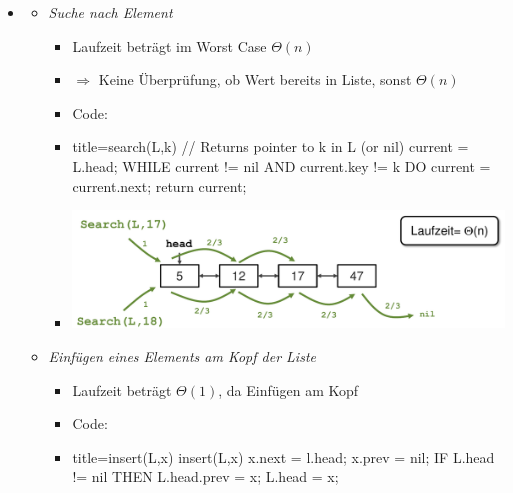 \documentclass[
    12pt,
    a4paper,
    ngerman,
    color=3b,%
    marginpar=false,
    colorback=false,
    leqno,
]{tudaexercise}
\begin{document}
\begin{itemize}
    \item {}
          \begin{itemize}
              \item \textit{Suche nach Element}
                    \begin{itemize}
                        \item Laufzeit beträgt im Worst Case $\Theta(n)$
                        \item[] $\Rightarrow$ Keine Überprüfung, ob Wert bereits in Liste, sonst $\Theta(n)$
                        \item Code:
                        \item[]
                              \begin{ccode}[autogobble]{title={search(L,k) // Returns pointer to k in L (or nil)}}
                                  current = L.head;
                                  WHILE current != nil AND current.key != k DO
                                    current = current.next;
                                  return current;
                              \end{ccode}
                        \item[] \includegraphics[width=12cm]{pictures/verketteteListenSuche.pdf}
                    \end{itemize}

                    \clearpage
              \item \textit{Einfügen eines Elements am Kopf der Liste}
                    \begin{itemize}
                        \item Laufzeit beträgt $\Theta(1)$, da Einfügen am Kopf
                        \item Code:
                        \item[]
                              \begin{ccode}[autogobble]{title={insert(L,x)}}
                                  insert(L,x)
                                  x.next = l.head;
                                  x.prev = nil;
                                  IF L.head != nil THEN
                                    L.head.prev = x;
                                  L.head = x;
                              \end{ccode}
                    \end{itemize}


\end{itemize}
\end{itemize}
\end{document}
